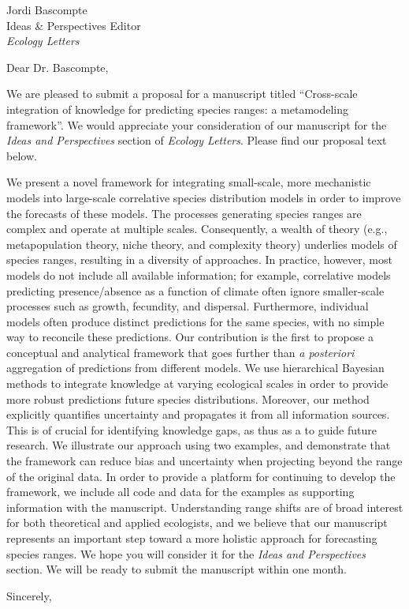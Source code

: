 \documentclass[11pt]{letter}
\makeatletter
\renewcommand{\closing}[1]{\par\nobreak\vspace{\parskip}%
  \stopbreaks
  \noindent
  \ifx\@empty\fromaddress\else
  \hspace*{\longindentation}\fi
  \parbox{\indentedwidth}{\raggedright
       \ignorespaces #1\\[1\medskipamount]%
       \ifx\@empty\fromsig
           \fromname
       \else \fromsig \fi\strut}%
   \par}
\makeatother
\begin{document}

\begin{letter}{Jordi Bascompte \\ 
	Ideas \& Perspectives Editor \\
	\emph{Ecology Letters}
}
\opening{Dear Dr. Bascompte,}

We are pleased to submit a proposal for a manuscript titled ``Cross-scale integration of knowledge for predicting species ranges: a metamodeling framework''. 
We would appreciate your consideration of our manuscript for the \emph{Ideas and Perspectives} section of \emph{Ecology Letters}. Please find our proposal text below.


We present a novel framework for integrating small-scale, more mechanistic models into large-scale correlative species distribution models in order to improve the forecasts of these models.
The processes generating species ranges are complex and operate at multiple scales.
Consequently, a wealth of theory (e.g., metapopulation theory, niche theory, and complexity theory) underlies models of species ranges, resulting in a diversity of approaches.
In practice, however, most models do not include all available information; for example, correlative models predicting presence/absence as a function of climate often ignore smaller-scale processes such as growth, fecundity, and dispersal.
Furthermore, individual models often produce distinct predictions for the same species, with no simple way to reconcile these predictions.
Our contribution is the first to propose a conceptual and analytical framework that goes further than \emph{a posteriori} aggregation of predictions from different models. 
We use hierarchical Bayesian methods to integrate knowledge at varying ecological scales in order to provide more robust predictions future species distributions.
Moreover, our method explicitly quantifies uncertainty and propagates it from all information sources.
This is of crucial for identifying knowledge gaps, as thus as a to guide future research.
We illustrate our approach using two examples, and demonstrate that the framework can reduce bias and uncertainty when projecting beyond the range of the original data.
In order to provide a platform for continuing to develop the framework, we include all code and data for the examples as supporting information with the manuscript.
Understanding range shifts are of broad interest for both theoretical and applied ecologists, and we believe that our manuscript represents an important step toward a more holistic approach for forecasting species ranges.
We hope you will consider it for the \emph{Ideas and Perspectives} section. 
We will be ready to submit the manuscript within one month.

\closing{Sincerely,}

\end{letter}
\end{document}
